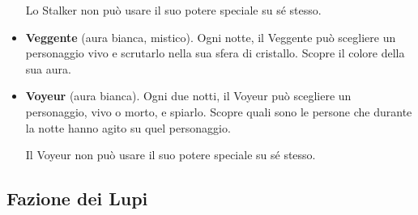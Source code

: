\documentclass[a4paper,10pt]{article}
\begin{document}
\begin{itemize}
 Lo Stalker non può usare il suo potere speciale su sé stesso.
 
 \item {\bf Veggente} (aura bianca, mistico). Ogni notte, il Veggente può scegliere un personaggio vivo e scrutarlo nella sua sfera di cristallo. Scopre il colore della sua aura.

 \item {\bf Voyeur} (aura bianca). Ogni due notti, il Voyeur può scegliere un personaggio, vivo o morto, e spiarlo. Scopre quali sono le persone che durante la notte hanno agito su quel personaggio.
 
 Il Voyeur non può usare il suo potere speciale su sé stesso.


\end{itemize}


\subsection*{Fazione dei Lupi}
\end{document}
